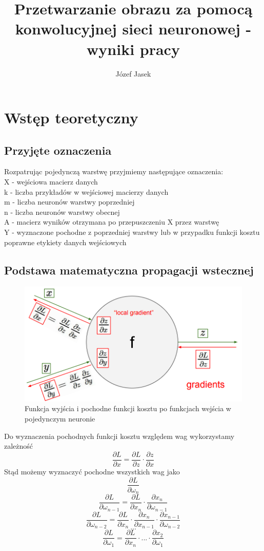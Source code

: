 \documentclass{article}
\title{Przetwarzanie obrazu za pomocą konwolucyjnej sieci neuronowej - wyniki pracy}
\author{Józef Jasek}
\begin{document}
\maketitle

\section{Wstęp teoretyczny}
\subsection{Przyjęte oznaczenia}
    Rozpatrując pojedynczą warstwę przyjmiemy następujące oznaczenia: \\
    X - wejściowa macierz danych \\
    k - liczba przykładów w wejściowej macierzy danych \\
    m - liczba neuronów warstwy poprzedniej \\
    n - liczba neuronów warstwy obecnej \\
    A - macierz wyników otrzymana po przepuszczeniu X przez warstwę \\
    Y - wyznaczone pochodne z poprzedniej warstwy lub w przypadku funkcji kosztu poprawne etykiety danych wejściowych
\subsection{Podstawa matematyczna propagacji wstecznej}
\begin{figure}[H]
    \centering
    \includegraphics[width=\textwidth]{neuron.png}
    \caption{Funkcja wyjścia i pochodne funkcji kosztu po funkcjach wejścia w pojedynczym neuronie}
    \label{fig:mesh1}
\end{figure}
Do wyznaczenia pochodnych funkcji kosztu względem wag wykorzystamy zależność
\[ \frac{\partial L}{\partial x} = \frac{\partial L}{\partial z} \cdot \frac{\partial z}{\partial x} \]
Stąd możemy wyznaczyć pochodne wszystkich wag jako
\[\frac{\partial L}{\partial \omega_n}\]
\[ \frac{\partial L}{\partial \omega_{n-1}} = \frac{\partial L}{\partial x_n} \cdot \frac{\partial x_n}{\partial \omega_{n-1}} \]
\[ \frac{\partial L}{\partial \omega_{n-2}} = \frac{\partial L}{\partial x_n} \cdot \frac{\partial x_n}{\partial x_{n-1}} \cdot \frac{\partial x_{n-1}}{\partial \omega_{n-2}} \]
\[ ... \]
\[ \frac{\partial L}{\partial \omega_1} = \frac{\partial L}{\partial x_n} \cdot ... \cdot \frac{\partial x_2}{\partial \omega_1} \]
\end{document}
